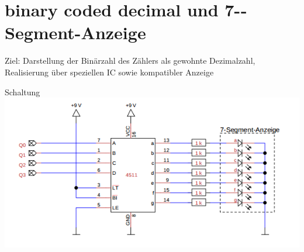 \documentclass[compress,11pt]{beamer}
\begin{document}
\section{binary coded decimal und 7-­Segment­-Anzeige}
\begin{frame}
Ziel: Darstellung der Binärzahl des Zählers als gewohnte Dezimalzahl, Realisierung über speziellen IC sowie kompatibler Anzeige
\begin{block}{Schaltung}
\includegraphics[scale=0.7]{a5sch}

\end{block}
\end{frame}
\end{document}

